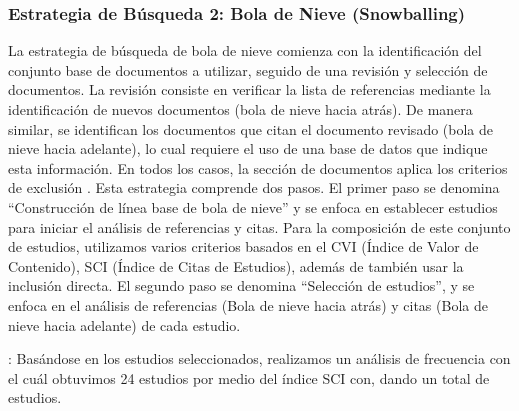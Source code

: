 \subsubsection{Estrategia de Búsqueda 2: Bola de Nieve (Snowballing)}

\newcommand{\csiSelected}{24} %
\newcommand{\afterCsiTotal}{\fpeval{\screenTot-\csiSelected}} %


La estrategia de búsqueda de bola de nieve comienza con la identificación del conjunto base de documentos a utilizar, seguido de una revisión y selección de documentos. La revisión consiste en verificar la lista de referencias mediante la identificación de nuevos documentos (bola de nieve hacia atrás). De manera similar, se identifican los documentos que citan el documento revisado (bola de nieve hacia adelante), lo cual requiere el uso de una base de datos que indique esta información. En todos los casos, la sección de documentos aplica los criterios de exclusión \cite{Wohlin-01}.
Esta estrategia comprende dos pasos. El primer paso se denomina ``Construcción de línea base de bola de nieve'' y se enfoca en establecer estudios para iniciar el análisis de referencias y citas. Para la composición de este conjunto de estudios, utilizamos varios criterios basados en el CVI (Índice de Valor de Contenido), SCI (Índice de Citas de Estudios), además de también usar la inclusión directa. El segundo paso se denomina ``Selección de estudios'', y se enfoca en el análisis de referencias (Bola de nieve hacia atrás) y citas (Bola de nieve hacia adelante) de cada estudio.


: Basándose en los \screenTot{} estudios seleccionados, realizamos un análisis de frecuencia con el cuál obtuvimos \csiSelected{} estudios por medio del índice SCI con, dando un total de \afterCsiTotal{} estudios. 




